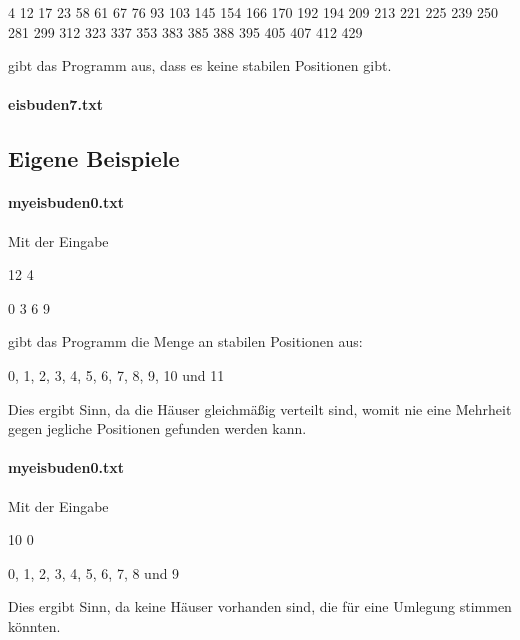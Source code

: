 \documentclass[a4paper,10pt,ngerman]{scrartcl}
\begin{document}
4 12 17 23 58 61 67 76 93 103 145 154 166 170 192 194 209 213 221 225 239 250 281 299 312 323 337 353 383 385 388 395 405 407 412 429

gibt das Programm aus, dass es keine stabilen Positionen gibt.

\paragraph{eisbuden7.txt}

\subsection{Eigene Beispiele}

\paragraph{myeisbuden0.txt}
Mit der Eingabe

12 4

0 3 6 9

gibt das Programm die Menge an stabilen Positionen aus:

0, 1, 2, 3, 4, 5, 6, 7, 8, 9, 10 und 11

Dies ergibt Sinn, da die Häuser gleichmäßig verteilt sind, womit nie eine Mehrheit gegen jegliche Positionen gefunden werden kann.

\paragraph{myeisbuden0.txt}
Mit der Eingabe

10 0


0, 1, 2, 3, 4, 5, 6, 7, 8 und 9

Dies ergibt Sinn, da keine Häuser vorhanden sind, die für eine Umlegung stimmen könnten.
\end{document}
